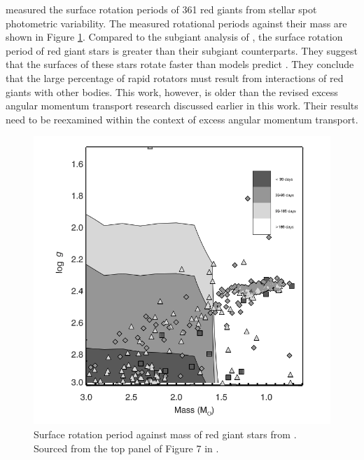 \citet{ceillier_surface_2017} measured the surface rotation periods of 361 red giants from stellar spot photometric variability.
The measured rotational periods against their mass are shown in Figure \ref{fig:rgb_surface}.
Compared to the subgiant analysis of \citet{santos_surface_2021}, the surface rotation period of red giant stars is greater than their subgiant counterparts.
They suggest that the surfaces of these stars rotate faster than models predict \citep{tayar_rapid_2015}.
They conclude that the large percentage of rapid rotators must result from interactions of red giants with other bodies.
This work, however, is older than the revised excess angular momentum transport research discussed earlier in this work.
Their results need to be reexamined within the context of excess angular momentum transport.

\begin{figure}[h]
    \includegraphics[width=\textwidth]{Figures/intro_figures/rgb_surface.png}
    \caption[Surface rotation period distribution of red giant stars]{Surface rotation period against mass of red giant stars from \citet{ceillier_surface_2017}.
    Sourced from the top panel of Figure 7 in \citet{ceillier_surface_2017}.}
    \label{fig:rgb_surface}
\end{figure}

